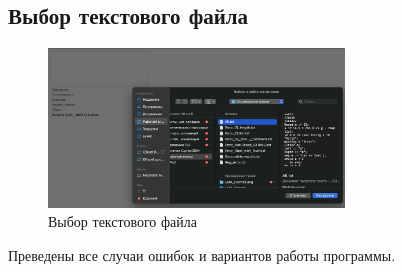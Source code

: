 \documentclass[areasetadvanced]{scrartcl}
\begin{document}
\subsection{Выбор текстового файла}
\begin{figure}[H]
    \centering
    \includegraphics[width=0.7\textwidth]{FileOpen.png}
    \caption{Выбор текстового файла}
    \label{fig:syntdiag}
\end{figure}
Преведены все случаи ошибок и вариантов работы программы.
\newpage
\end{document}
